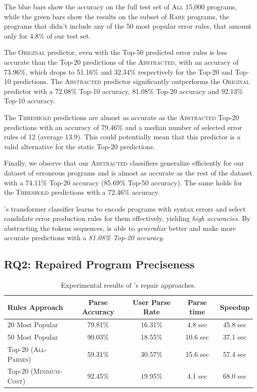 The blue bars show the accuracy on the full test set of \textsc{All} 15,000
programs, while the green bars show the results on the subset of \textsc{Rare}
programs, \ie the programs that didn't include any of the 50 most popular error
rules, that amount only for 4.8\% of our test set.

The \textsc{Original} predictor, even with the Top-50 predicted error rules is
less accurate than the Top-20 predictions of the \textsc{Abstracted}, with an
accuracy of 73.96\%, which drops to 51.16\% and 32.34\% respectively for the
Top-20 and Top-10 predictions. The \textsc{Abstracted} predictor significantly
outperforms the \textsc{Original} predictor with a 72.08\% Top-10 accuracy,
81.08\% Top-20 accuracy and 92.13\% Top-10 accuracy.

The \textsc{Threshold} predictions are almost as accurate as the
\textsc{Abstracted} Top-20 predictions with an accuracy of 79.46\% and a median
number of selected error rules of 12 (average 13.9). This could potentially mean
that this predictor is a valid alternative for the static Top-20 predictions.

Finally, we observe that our \textsc{Abstracted} classifiers generalize
efficiently for our dataset of erroneous \python programs and is almost as
accurate as the rest of the dataset with a 74.11\% Top-20 accuracy (85.69\%
Top-50 accuracy). The same holds for the \textsc{Threshold} predictions with a
72.46\% accuracy.

\begin{framed}
  \noindent \toolname's transformer classifier learns to encode programs with
  syntax errors and select candidate error production rules for them
  effectively, yielding \emph{high accuracies}. By abstracting the tokens
  sequences, \toolname is able to \emph{generalize} better and make more
  accurate predictions with a \emph{81.08\% Top-20 accuracy}.
\end{framed}


\subsection{RQ2: Repaired Program Preciseness}
\label{sec:eval:precise}

\begin{table}[t]
  \centering
  \begin{tabular}{l||cccc}
    Rules Approach                 & Parse Accuracy & User Parse Rate & Parse time & Speedup \\
    \hline
    20 Most Popular                & 79.81\% & 16.31\% & 4.8 sec  & 45.8 sec \\
    50 Most Popular                & 90.03\% & 18.55\% & 10.6 sec & 37.1 sec \\
    Top-20 (\textsc{All-Parses})   & 59.31\% & 30.57\% & 15.6 sec & 57.4 sec \\
    Top-20 (\textsc{Minimum-Cost}) & 92.45\% & 19.95\% & 4.1 sec  & 68.0 sec \\
  \end{tabular}
  \caption{Experimental results of \toolname's repair approaches.}
  \label{tab:seq2parse_full_results}
\end{table}

